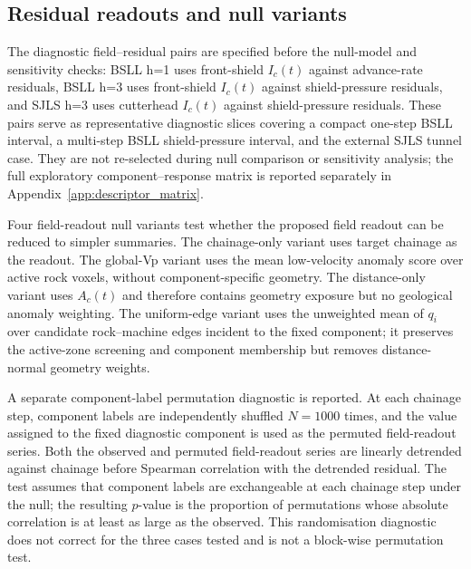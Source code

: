 \subsection{Residual readouts and null variants}
\label{sec:diagnostic_readout_variants}

The diagnostic field--residual pairs are specified before the null-model
and sensitivity checks: BSLL h=1 uses front-shield $I_c(t)$ against
advance-rate residuals, BSLL h=3 uses front-shield $I_c(t)$ against
shield-pressure residuals, and SJLS h=3 uses cutterhead $I_c(t)$ against
shield-pressure residuals. These pairs serve as representative diagnostic
slices covering a compact one-step BSLL interval, a multi-step BSLL
shield-pressure interval, and the external SJLS tunnel case. They are not
re-selected during null comparison or sensitivity analysis; the full
exploratory component--response matrix is reported separately in
Appendix~\ref{app:descriptor_matrix}.

Four field-readout null variants test whether the proposed
field readout can be reduced to simpler summaries. The chainage-only variant uses
target chainage as the readout. The global-Vp variant uses the mean
low-velocity anomaly score over active rock voxels, without component-specific
geometry. The distance-only variant uses $A_c(t)$ and therefore contains
geometry exposure but no geological anomaly weighting. The uniform-edge variant
uses the unweighted mean of $q_i$ over candidate rock--machine edges incident to
the fixed component; it preserves the active-zone screening and component
membership but removes distance-normal geometry weights.

A separate component-label permutation diagnostic is reported. At each
chainage step, component labels are independently shuffled $N=1000$ times, and
the value assigned to the fixed diagnostic component is used as the
permuted field-readout series. Both the observed and permuted field-readout series
are linearly detrended against chainage before Spearman correlation with the
detrended residual. The test assumes that component labels are exchangeable at
each chainage step under the null; the resulting $p$-value is the proportion
of permutations whose absolute correlation is at least as large as the
observed. This randomisation diagnostic does not correct for the three cases
tested and is not a block-wise permutation test.

